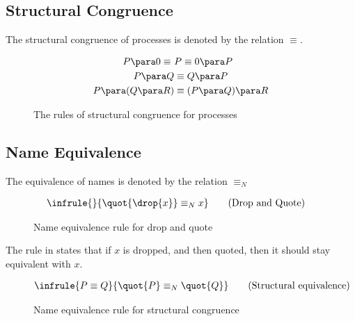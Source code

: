 \subsection{Structural Congruence}
The structural congruence of processes is denoted by the relation $\equiv$.

\begin{figure}[h]
    \begin{align*}
        P\para 0 \equiv\ &P \equiv 0\para P\\
        P\para Q &\equiv Q\para P\\
        P\para (Q\para R)&\equiv (P\para Q)\para R
    \end{align*}
    \caption{The rules of structural congruence for processes}
\end{figure}


\FloatBarrier

\subsection{Name Equivalence}
The equivalence of names is denoted by the relation $\equiv _N$

\begin{figure}[h]
	\begin{align}
	& \infrule{}{\quot{\drop{x}}\equiv _N x} \tag{Drop and Quote}
	\end{align}
	\caption{Name equivalence rule for drop and quote}
	\label{fig:dropquot}
\end{figure}

\noindent
The rule in  states that if $x$ is dropped, and then quoted, then it should stay equivalent with $x$.

\begin{figure}[h]
	\begin{align}
	& \infrule{P\equiv Q}{\quot{P} \equiv _N \quot{Q}} \tag{Structural equivalence}
	\end{align}
	\caption{Name equivalence rule for structural congruence}
	\label{fig:strucequiv}
\end{figure}

